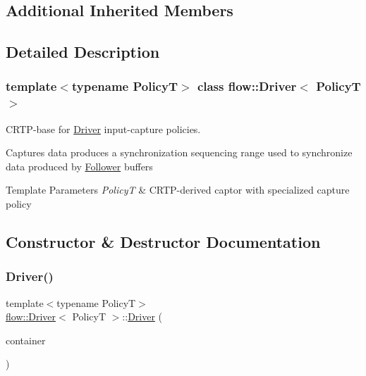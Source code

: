 \subsection*{Additional Inherited Members}


\subsection{Detailed Description}
\subsubsection*{template$<$typename PolicyT$>$\newline
class flow\+::\+Driver$<$ Policy\+T $>$}

C\+R\+T\+P-\/base for \hyperlink{classflow_1_1_driver}{Driver} input-\/capture policies. 

Captures data produces a synchronization sequencing range used to synchronize data produced by \hyperlink{classflow_1_1_follower}{Follower} buffers


\begin{DoxyTemplParams}{Template Parameters}
{\em PolicyT} & C\+R\+T\+P-\/derived captor with specialized capture policy \\
\hline
\end{DoxyTemplParams}


\subsection{Constructor \& Destructor Documentation}
\mbox{\label{classflow_1_1_driver_a9de906918fedf1f3ffbc4509a5b8b311}} 
\subsubsection{\texorpdfstring{Driver()}{Driver()}}
{\footnotesize\ttfamily template$<$typename PolicyT$>$ \\
\hyperlink{classflow_1_1_driver}{flow\+::\+Driver}$<$ PolicyT $>$\+::\hyperlink{classflow_1_1_driver}{Driver} (\begin{DoxyParamCaption}\item[{const \hyperlink{classflow_1_1_driver_a422446d9a2d8ae99613e3c5728956921}{Dispatch\+Container\+Type} \&}]{container }\end{DoxyParamCaption})\hspace{0.3cm}{\ttfamily [explicit]}}



